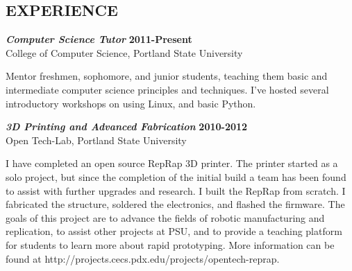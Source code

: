 \documentclass[margin]{res}
\begin{document}
\begin{resume}
\section{EXPERIENCE}
				{\sl \textbf{Computer Science Tutor}} \hfill \textbf{2011-Present} \\
                College of Computer Science, Portland State University \hfill
				
				Mentor freshmen, sophomore, and junior students, teaching them basic and intermediate 
				computer science principles and techniques.	I've hosted several introductory workshops 
				on using Linux, and basic Python.
				
				{\sl \textbf{3D Printing and Advanced Fabrication}} \hfill \textbf{2010-2012} \\
                Open Tech-Lab, Portland State University
				
				I have completed an open source RepRap 3D printer. The printer started as a solo project, 
				but since the completion of the initial build a team has been found to assist with further 
				upgrades and research.  I built the RepRap from scratch.  I fabricated the structure, soldered  
				the electronics, and flashed the firmware. 	The goals of this project are to advance the 
				fields of robotic manufacturing and replication, to assist other projects at PSU, and to 
				provide a teaching platform for students to learn more about rapid prototyping. 
				More information can be found at http://projects.cecs.pdx.edu/projects/opentech-reprap. 
 				
\end{resume}
\end{document}
